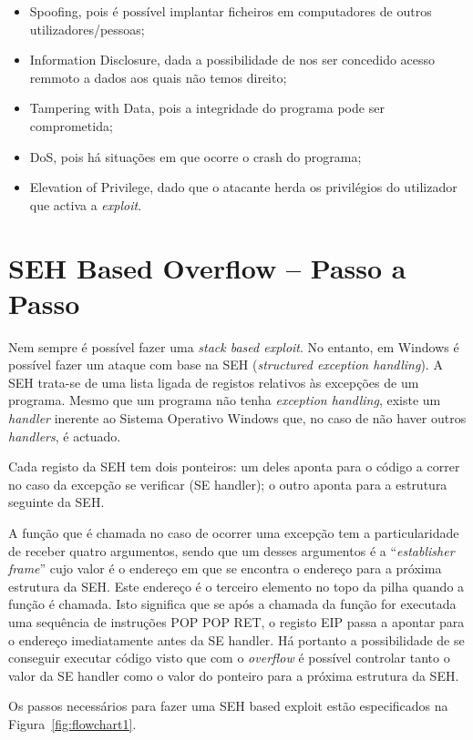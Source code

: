 \documentclass[a4paper]{article}
\begin{document}
\begin{itemize}
        \item Spoofing, pois é possível implantar ficheiros em computadores de outros utilizadores/pessoas;
        \item Information Disclosure, dada a possibilidade de nos ser concedido acesso remmoto a dados aos quais não temos direito;
        \item Tampering with Data, pois a integridade do programa pode ser comprometida;
        \item DoS, pois há situações em que ocorre o crash do programa;
        \item Elevation of Privilege, dado que o atacante herda os privilégios do utilizador que activa a \textit{exploit}.
\end{itemize}

\section{SEH Based Overflow -- Passo a Passo}

Nem sempre é possível fazer uma \textit{stack based exploit}. No entanto, em Windows é possível fazer um ataque com base na SEH (\textit{structured exception handling}). A SEH trata-se de uma lista ligada de registos relativos às excepções de um programa. Mesmo que um programa não tenha \textit{exception handling}, existe um \textit{handler} inerente ao Sistema Operativo Windows que, no caso de não haver outros \textit{handlers}, é actuado.

Cada registo da SEH tem dois ponteiros: um deles aponta para o código a correr no caso da excepção se verificar (SE handler); o outro aponta para a estrutura seguinte da SEH.

A função que é chamada no caso de ocorrer uma excepção tem a particularidade de receber quatro argumentos, sendo que um desses argumentos é a ``\textit{establisher frame}'' cujo valor é o endereço em que se encontra o endereço para a próxima estrutura da SEH. Este endereço é o terceiro elemento no topo da pilha quando a função é chamada. Isto significa que se após a chamada da função for executada uma sequência de instruções POP POP RET, o registo EIP passa a apontar para o endereço imediatamente antes da SE handler. Há portanto a possibilidade de se conseguir executar código visto que com o \textit{overflow} é possível controlar tanto o valor da SE handler como o valor do ponteiro para a próxima estrutura da SEH.

Os passos necessários para fazer uma SEH based exploit estão especificados na Figura~\ref{fig:flowchart1}.
\end{document}
